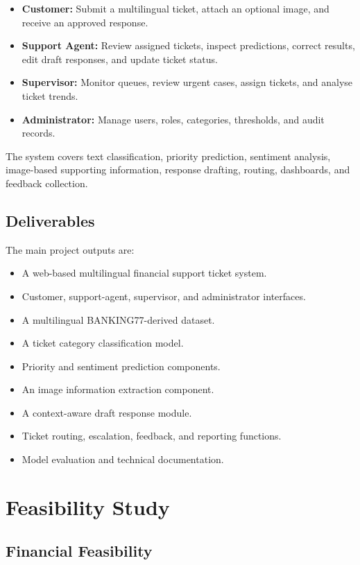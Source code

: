 \documentclass[11pt,a4paper]{article}
\begin{document}
\begin{itemize}
    \item \textbf{Customer:} Submit a multilingual ticket, attach an optional image, and receive an approved response.
    \item \textbf{Support Agent:} Review assigned tickets, inspect predictions, correct results, edit draft responses, and update ticket status.
    \item \textbf{Supervisor:} Monitor queues, review urgent cases, assign tickets, and analyse ticket trends.
    \item \textbf{Administrator:} Manage users, roles, categories, thresholds, and audit records.
\end{itemize}

The system covers text classification, priority prediction, sentiment analysis, image-based supporting information, response drafting, routing, dashboards, and feedback collection.

\subsection{Deliverables}

The main project outputs are:

\begin{itemize}
    \item A web-based multilingual financial support ticket system.
    \item Customer, support-agent, supervisor, and administrator interfaces.
    \item A multilingual BANKING77-derived dataset.
    \item A ticket category classification model.
    \item Priority and sentiment prediction components.
    \item An image information extraction component.
    \item A context-aware draft response module.
    \item Ticket routing, escalation, feedback, and reporting functions.
    \item Model evaluation and technical documentation.
\end{itemize}

\section{Feasibility Study}

\subsection{Financial Feasibility}
\end{document}
